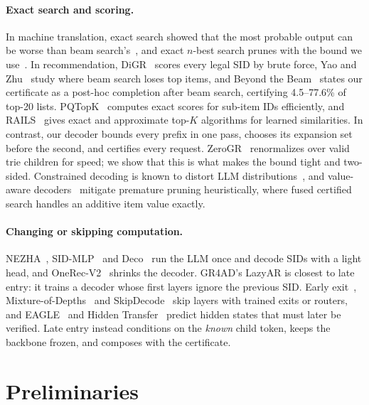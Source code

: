 \documentclass[sigconf,anonymous]{acmart}
\begin{document}
\paragraph{Exact search and scoring.} In machine translation, exact search showed that the most probable output can
be worse than beam search's~\cite{stahlberg2019,meister2020}, and exact $n$-best search prunes with the bound we
use~\cite{stahlberg2022}. In recommendation, DiGR~\cite{ax2602.07847} scores every legal SID by brute force,
Yao and Zhu~\cite{ax2611.01072} study where beam search loses top items, and Beyond the Beam~\cite{ax2609.33745}
states our certificate as a post-hoc completion after beam search, certifying 4.5--77.6\% of top-20 lists.
PQTopK~\cite{petrov2024pqtopk} computes exact scores for sub-item IDs efficiently, and RAILS~\cite{ding2025rails}
gives exact and approximate top-$K$ algorithms for learned similarities. In contrast, our decoder bounds every
prefix in one pass, chooses its expansion set before the second, and certifies every request.
ZeroGR~\cite{ax2611.04715} renormalizes over valid trie children for speed; we show that this is what makes the
bound tight and two-sided. Constrained decoding is known to distort LLM distributions~\cite{ax2405.21047,
ax2504.09935}, and value-aware decoders~\cite{ax2602.10699,ax2611.02981} mitigate premature pruning heuristically,
where fused certified search handles an additive item value exactly.

\paragraph{Changing or skipping computation.} NEZHA~\cite{ax2511.18793}, SID-MLP~\cite{ax2605.12617} and
Deco~\cite{ax2610.32980} run the LLM once and decode SIDs with a light head, and OneRec-V2~\cite{ax2508.20900}
shrinks the decoder. GR4AD's LazyAR is closest to late entry: it trains a decoder whose first layers ignore the
previous SID. Early exit~\cite{schuster2022,elhoushi2024}, Mixture-of-Depths~\cite{raposo2024} and
SkipDecode~\cite{delcorro2023} skip layers with trained exits or routers, and EAGLE~\cite{li2024eagle} and Hidden
Transfer~\cite{ax2404.12022} predict hidden states that must later be verified. Late entry instead conditions on
the \emph{known} child token, keeps the backbone frozen, and composes with the certificate.

\section{Preliminaries}
\label{sec:prelim}
\end{document}
